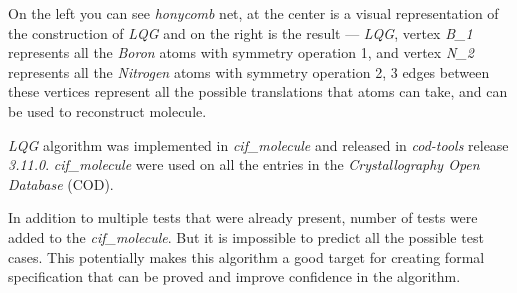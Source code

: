 
On the left you can see \textit{honycomb} net, at the center is a visual representation of the construction of \textit{LQG} and on the right is the result --- \textit{LQG}, vertex \textit{B\_1} represents all the \textit{Boron} atoms with symmetry operation 1, and vertex \textit{N\_2} represents all the \textit{Nitrogen} atoms with symmetry operation 2, 3 edges between these vertices represent all the possible translations that atoms can take, and can be used to reconstruct molecule.

\textit{LQG} algorithm was implemented in \textit{cif\_molecule} and released in \textit{cod-tools} release \textit{3.11.0}\cite{cod-tools}. \textit{cif\_molecule} were used on all the entries in the \textit{Crystallography Open Database} (COD)\cite{Grazulis2011}.

In addition to multiple tests that were already present, number of tests were added to the \textit{cif\_molecule}. But it is impossible to predict all the possible test cases. This potentially makes this algorithm a good target for creating formal specification that can be proved and improve confidence in the algorithm.
